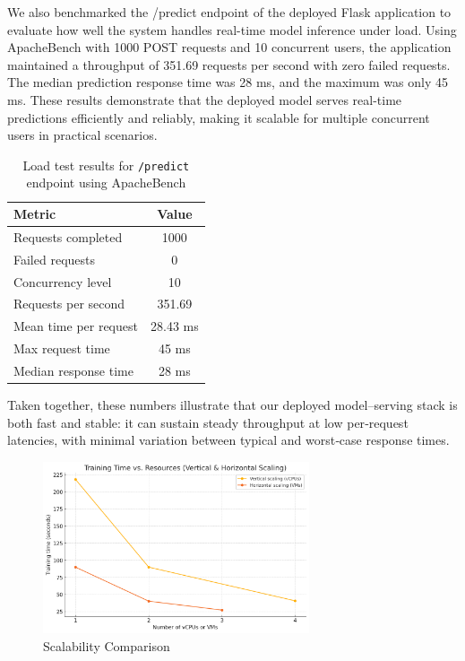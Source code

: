 \documentclass[12pt,a4paper]{article}
\begin{document}
We also benchmarked the /predict endpoint of the deployed Flask application to evaluate how well the system handles real-time model inference under load. Using ApacheBench with 1000 POST requests and 10 concurrent users, the application maintained a throughput of 351.69 requests per second with zero failed requests. The median prediction response time was 28 ms, and the maximum was only 45 ms. These results demonstrate that the deployed model serves real-time predictions efficiently and reliably, making it scalable for multiple concurrent users in practical scenarios.

\begin{table}[H]
\centering
\caption{Load test results for \texttt{/predict} endpoint using ApacheBench}
\begin{tabular}{|l|c|}
\hline
\textbf{Metric} & \textbf{Value} \\
\hline
Requests completed         & 1000 \\
Failed requests            & 0 \\
Concurrency level          & 10 \\
Requests per second        & 351.69 \\
Mean time per request      & 28.43 ms \\
Max request time           & 45 ms \\
Median response time       & 28 ms \\
\hline
\end{tabular}
\label{tab:predict-benchmark}
\end{table}

Taken together, these numbers illustrate that our deployed model–serving stack is both fast and stable: it can sustain steady throughput at low per‐request latencies, with minimal variation between typical and worst‐case response times.

\begin{figure}[H]
  \centering
  \includegraphics[width=0.7\textwidth]{Comparison.png}
  \caption{Scalability Comparison}
  \label{fig:my-image}
\end{figure}
\end{document}
